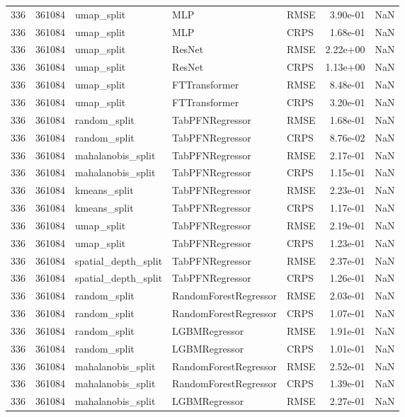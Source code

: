\begin{tabular}{rrlllrr}
336 & 361084 & umap\_split & MLP & RMSE & 3.90e-01 & NaN \\
336 & 361084 & umap\_split & MLP & CRPS & 1.68e-01 & NaN \\
336 & 361084 & umap\_split & ResNet & RMSE & 2.22e+00 & NaN \\
336 & 361084 & umap\_split & ResNet & CRPS & 1.13e+00 & NaN \\
336 & 361084 & umap\_split & FTTransformer & RMSE & 8.48e-01 & NaN \\
336 & 361084 & umap\_split & FTTransformer & CRPS & 3.20e-01 & NaN \\
336 & 361084 & random\_split & TabPFNRegressor & RMSE & 1.68e-01 & NaN \\
336 & 361084 & random\_split & TabPFNRegressor & CRPS & 8.76e-02 & NaN \\
336 & 361084 & mahalanobis\_split & TabPFNRegressor & RMSE & 2.17e-01 & NaN \\
336 & 361084 & mahalanobis\_split & TabPFNRegressor & CRPS & 1.15e-01 & NaN \\
336 & 361084 & kmeans\_split & TabPFNRegressor & RMSE & 2.23e-01 & NaN \\
336 & 361084 & kmeans\_split & TabPFNRegressor & CRPS & 1.17e-01 & NaN \\
336 & 361084 & umap\_split & TabPFNRegressor & RMSE & 2.19e-01 & NaN \\
336 & 361084 & umap\_split & TabPFNRegressor & CRPS & 1.23e-01 & NaN \\
336 & 361084 & spatial\_depth\_split & TabPFNRegressor & RMSE & 2.37e-01 & NaN \\
336 & 361084 & spatial\_depth\_split & TabPFNRegressor & CRPS & 1.26e-01 & NaN \\
336 & 361084 & random\_split & RandomForestRegressor & RMSE & 2.03e-01 & NaN \\
336 & 361084 & random\_split & RandomForestRegressor & CRPS & 1.07e-01 & NaN \\
336 & 361084 & random\_split & LGBMRegressor & RMSE & 1.91e-01 & NaN \\
336 & 361084 & random\_split & LGBMRegressor & CRPS & 1.01e-01 & NaN \\
336 & 361084 & mahalanobis\_split & RandomForestRegressor & RMSE & 2.52e-01 & NaN \\
336 & 361084 & mahalanobis\_split & RandomForestRegressor & CRPS & 1.39e-01 & NaN \\
336 & 361084 & mahalanobis\_split & LGBMRegressor & RMSE & 2.27e-01 & NaN \\

\end{tabular}
